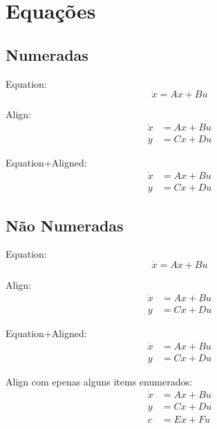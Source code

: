 
\section{Equações}
\subsection{Numeradas}

Equation:
\begin{equation}
  \dot{x} = Ax+Bu
\end{equation}

Align:
\begin{align}
  \dot{x} & = Ax+Bu \\
  y       & =Cx+Du
\end{align}

Equation+Aligned:
\begin{equation}
  \begin{aligned}
    \dot{x} & = Ax+Bu \\
    y       & =Cx+Du
  \end{aligned}
\end{equation}

\subsection{Não Numeradas}

Equation:
\begin{equation*}
  \dot{x} = Ax+Bu
\end{equation*}

Align:
\begin{align*}
  \dot{x} & = Ax+Bu \\
  y       & =Cx+Du
\end{align*}

Equation+Aligned:
\begin{equation*}
  \begin{aligned}
    \dot{x} & = Ax+Bu \\
    y       & =Cx+Du
  \end{aligned}
\end{equation*}

Align com epenas alguns items enumerados:
\begin{align}
  \dot{x} & = Ax+Bu           \\
  y       & = Cx+Du           \\
  c       & = Ex+Fu \nonumber %
\end{align}
